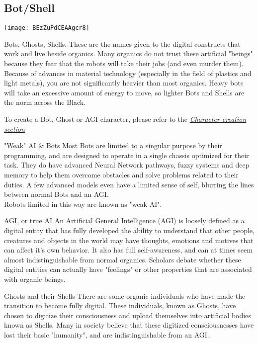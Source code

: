 \subsection{Bot/Shell}
\label{sec:specie-bots}

\texttt{[image: BEzZuPdCEAAgcr8]}

Bots, Ghosts, Shells. These are the names given to the digital constructs that work and live beside organics. Many organics do not trust these artificial "beings" because they fear that the robots will take their jobs (and even murder them). Because of advances in material technology (especially in the field of plastics and light metals), you are not significantly heavier than most organics. Heavy bots will take an excessive amount of energy to move, so lighter Bots and Shells are the norm across the Black.

To create a Bot, Ghost or AGI character, please refer to the \textit{\hyperref[sec:rules-creation]{Character creation section}}\\

\begin{genericsection}{"Weak" AI \& Bots}
Most Bots are limited to a singular purpose by their programming, and are designed to operate in a single chassis optimized for their task. They do have advanced Neural Network pathways, fuzzy systems and deep memory to help them overcome obstacles and solve problems related to their duties. A few advanced models even have a limited sense of self, blurring the lines between normal Bots and an AGI.\\

Robots limited in this way are known as "weak AI".
\end{genericsection}

\begin{genericsection}{AGI, or true AI}
An Artificial General Intelligence (AGI) is loosely defined as a digital entity that has fully developed the ability to understand that other people, creatures and objects in the world may have thoughts, emotions and motives that can affect it's own behavior. It also has full self-awareness, and can at times seem almost indistinguishable from normal organics. Scholars debate whether these digital entities can actually have "feelings" or other properties that are associated with organic beings.
\end{genericsection}

\begin{genericsection}{Ghosts and their Shells}
There are some organic individuals who have made the transition to become fully digital. These individuals, known as Ghosts, have chosen to digitize their consciousness and upload themselves into artificial bodies known as Shells. Many in society believe that these digitized consciousnesses have lost their basic "humanity", and are indistinguishable from an AGI.
\end{genericsection}

